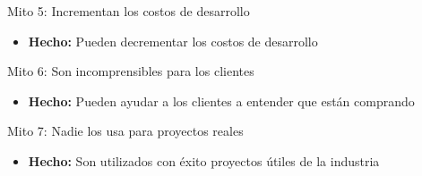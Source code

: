 \documentclass{beamer}
\begin{document}
\begin{frame}{Mito 5: Incrementan los costos de desarrollo}
\begin{itemize}[<+->]
\item \textbf{Hecho:} Pueden decrementar los costos de desarrollo
\end{itemize}
\end{frame}
 
\begin{frame}{Mito 6: Son incomprensibles para los clientes}
\begin{itemize}[<+->]
\item \textbf{Hecho:} Pueden ayudar a los clientes a entender que est\'an comprando
\end{itemize}
\end{frame}
 
\begin{frame}{Mito 7: Nadie los usa para proyectos reales}
\begin{itemize}[<+->]
\item \textbf{Hecho:} Son utilizados con \'exito proyectos \'utiles de la industria
\end{itemize}
\end{frame}
\end{document}
